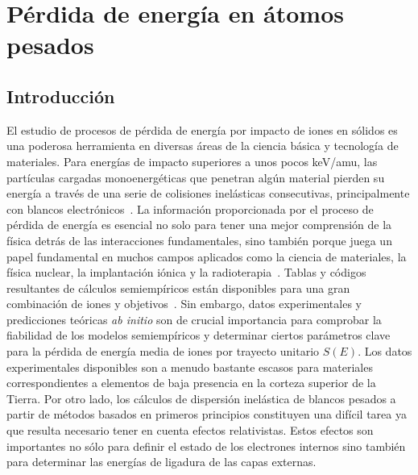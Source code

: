 \chapter{Pérdida de energía en átomos pesados}
\label{chap:heavy}

\section{Introducción}
\label{sec:intro}

El estudio de procesos de pérdida de energía por impacto de iones 
en sólidos es una poderosa herramienta en diversas áreas de la ciencia
básica y tecnología de materiales. Para energías de impacto superiores 
a unos pocos keV/amu, las partículas cargadas monoenergéticas que 
penetran algún material pierden su energía a través de una serie de 
colisiones inelásticas consecutivas, principalmente con blancos
electrónicos~\cite{Chu:01,Sigmund:06}. La información proporcionada por 
el proceso de pérdida de energía es esencial no solo para tener una 
mejor comprensión de la física detrás de las interacciones fundamentales, 
sino también porque juega un papel fundamental en muchos campos 
aplicados como la ciencia de materiales, la física nuclear, la 
implantación iónica y la radioterapia~\cite{Sigmund:06,Schardt:10}. 
Tablas y códigos resultantes de cálculos semiempíricos están disponibles 
para una gran combinación de iones y objetivos~\cite{iaea_codes,Paul:03}. 
Sin embargo, datos experimentales y predicciones teóricas 
\textit{ab initio} son de crucial importancia para comprobar la 
fiabilidad de los modelos semiempíricos y determinar ciertos 
parámetros clave~\cite{Diwan:15,Damache:04,Damache:02} para la pérdida 
de energía media de iones por trayecto unitario $S(E)$. Los datos 
experimentales disponibles son a menudo bastante escasos para materiales 
correspondientes a elementos de baja presencia en la corteza superior de 
la Tierra. Por otro lado, los cálculos de dispersión inelástica de 
blancos pesados a partir de métodos basados en primeros principios 
constituyen una difícil tarea ya que resulta necesario tener en cuenta 
efectos relativistas. Estos efectos son importantes no sólo para definir 
el estado de los electrones internos sino también para determinar las 
energías de ligadura de las capas externas.

